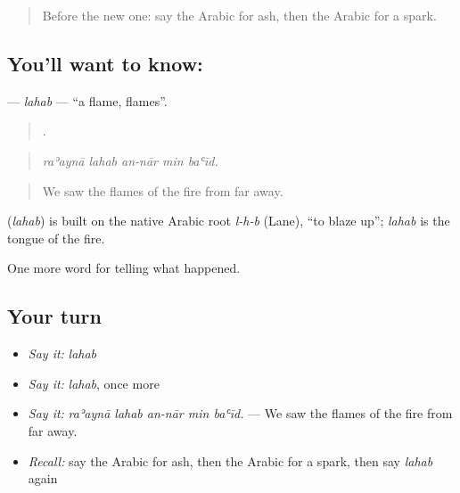 \label{lesson:AR-C354-lahab}



\begin{quote}
Before the new one: say the Arabic for ash, then the Arabic for a spark.
\end{quote}

\subsection*{You'll want to know: }
\textbf{} — \emph{lahab} — \textquotedblleft{}a flame, flames\textquotedblright{}.

\begin{quote}
    .
\end{quote}

\begin{quote}
\emph{raʾaynā lahab an-nār min baʿīd.}
\end{quote}

\begin{quote}
We saw the flames of the fire from far away.
\end{quote}

\begin{cousinweb}
\textbf{} (\emph{lahab}) is built on the native Arabic root \emph{l-h-b} (Lane), \textquotedblleft{}to blaze up\textquotedblright{}; \emph{lahab} is the tongue of the fire.
\end{cousinweb}

\begin{grammarlens}[title={What you've built}]
One more word for telling what happened.
\end{grammarlens}

\subsection*{Your turn}
\begin{itemize}
\raggedright
  \item \emph{Say it:} \emph{lahab}
  \item \emph{Say it:} \emph{lahab}, once more
  \item \emph{Say it:} \emph{raʾaynā lahab an-nār min baʿīd.} — We saw the flames of the fire from far away.
  \item \emph{Recall:} say the Arabic for ash, then the Arabic for a spark, then say \emph{lahab} again
\end{itemize}


